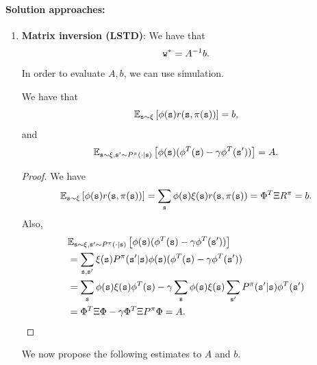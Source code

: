 \paragraph{Solution approaches:}
\begin{enumerate}
\item \textbf{Matrix inversion (LSTD)}: 
We have that $${\tt w}^* = A^{-1}b.$$
In order to evaluate $A,b$, we can use simulation.
\begin{proposition}\label{prop:TD_expectations}
    We have that 
    \begin{equation*}
        \mathbb{E}_{{\tt s}\sim\xi}\left[ {\phi}({\tt s}) r({\tt s},\pi({\tt s})) \right] = b,
    \end{equation*}
    and
    \begin{equation*}
        \mathbb{E}_{{\tt s}\sim\xi, {\tt s}'\sim P^\pi(\cdot|{\tt s})}\left[ {\phi}({\tt s})( {\phi}^T({\tt s})-\gamma {\phi}^T({\tt s}')) \right] = A.
    \end{equation*}
\end{proposition}
\begin{proof}
    We have
    \begin{equation*}
        \mathbb{E}_{{\tt s}\sim\xi}\left[ {\phi}({\tt s}) r({\tt s},\pi({\tt s})) \right] = \sum_{{\tt s}}  {\phi}({\tt s}) \xi({\tt s}) r({\tt s},\pi({\tt s})) = \Phi^T\Xi R^\pi = b.
    \end{equation*}
    Also,
    \begin{equation*}
    \begin{split}
        &\mathbb{E}_{{\tt s}\sim\xi, {\tt s}'\sim P^\pi(\cdot|{\tt s})}\left[ {\phi}({\tt s})( {\phi}^T({\tt s})-\gamma {\phi}^T({\tt s}')) \right] \\
        &= \sum_{{\tt s},{\tt s}'} \xi({\tt s})P^\pi({\tt s}'|{\tt s}){\phi}({\tt s})( {\phi}^T({\tt s})-\gamma {\phi}^T({\tt s}')) \\
        &= \sum_{{\tt s}} {\phi}({\tt s}) \xi({\tt s}){\phi}^T({\tt s}) - \gamma\sum_{{\tt s}}{\phi}({\tt s})\xi({\tt s})\sum_{{\tt s}'}P^\pi({\tt s}'|{\tt s}){\phi}^T({\tt s}')\\
        &= \Phi^T \Xi \Phi -\gamma \Phi^T\Xi P^\pi \Phi = A.
    \end{split}
    \end{equation*}
\end{proof}
We now propose the following estimates to $A$ and $b$. 


\end{enumerate}
